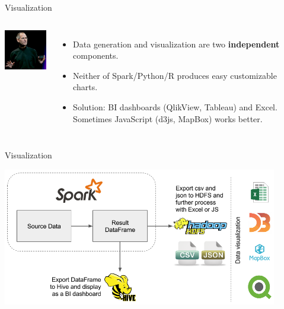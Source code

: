 \documentclass[unicode, notheorems]{beamer}
\begin{document}
\begin{frame}{Visualization}
\begin{columns}
\begin{center}
	\includegraphics[width=3.2cm]{images/presenter}
\end{center}

\begin{itemize}
\item Data generation and visualization are two \textbf{independent} components. \pause %
\item Neither of Spark/Python/R produces easy customizable charts. \pause %
\item Solution: BI dashboards (QlikView, Tableau) and Excel. Sometimes JavaScript (d3js, MapBox) works better.
\end{itemize}

\end{columns}
\end{frame}


\begin{frame}{Visualization}
\begin{center}
\includegraphics[width=12cm]{images/visualization}
\end{center}
\end{frame}
\end{document}
